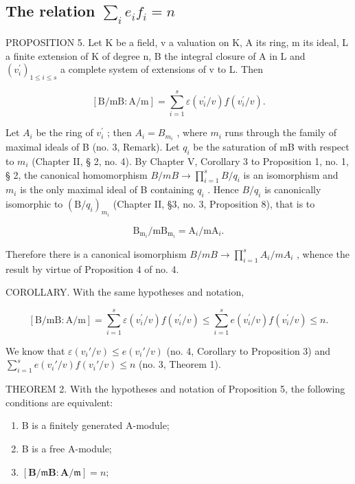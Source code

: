 \subsection{\texorpdfstring{The relation \(\sum_{i} e_{i} f_{i} = n\)}{The relation Σ ei fi = n}}

PROPOSITION 5. Let K be a field, v a valuation on K, A its ring, m its ideal, L a finite extension of K of degree n, B the integral closure of A in L and \((v_{i}^{\prime})_{1 \leq i \leq s}\) a complete system of extensions of v to L. Then

\[
[ \mathrm{B} / \mathrm{mB}: \mathrm{A} / \mathrm{m} ] = \sum_ {i = 1} ^ {s} \varepsilon (v _ {i} ^ {\prime} / v) f (v _ {i} ^ {\prime} / v).
\]

Let \(A_{i}\) be the ring of \(v_{i}^{\prime}\) ; then \(A_{i} = B_{m_{i}}\) , where \(m_{i}\) runs through the family of maximal ideals of B (no. 3, Remark). Let \(q_{i}\) be the saturation of mB with respect to \(m_{i}\) (Chapter II, § 2, no. 4). By Chapter V, Corollary 3 to Proposition 1, no. 1, § 2, the canonical homomorphism \(B/mB \rightarrow \prod_{i=1}^{s} B/q_i\) is an isomorphism and \(m_i\) is the only maximal ideal of B containing \(q_i\) . Hence \(B/q_i\) is canonically isomorphic to \((\mathrm{B}/q_i)_{m_i}\) (Chapter II, §3, no. 3, Proposition 8), that is to

\[
\mathrm{B} _ {\mathrm{m} _ {i}} / \mathrm{mB} _ {\mathrm{m} _ {i}} = \mathrm{A} _ {i} / \mathrm{mA} _ {i}.
\]

Therefore there is a canonical isomorphism \(B/mB \rightarrow \prod_{i=1}^{s} A_{i}/mA_{i}\) , whence the result by virtue of Proposition 4 of no. 4.

COROLLARY. With the same hypotheses and notation,

\[
[ \mathrm{B} / \mathrm{mB}: \mathrm{A} / \mathrm{m} ] = \sum_ {i = 1} ^ {s} \varepsilon (v _ {i} ^ {\prime} / v) f (v _ {i} ^ {\prime} / v) \leqslant \sum_ {i = 1} ^ {s} e (v _ {i} ^ {\prime} / v) f (v _ {i} ^ {\prime} / v) \leqslant n.
\]

We know that \(\varepsilon(v_i'/v) \leqslant e(v_i'/v)\) (no. 4, Corollary to Proposition 3) and \(\sum_{i=1}^{s} e(v_i'/v)f(v_i'/v) \leqslant n\) (no. 3, Theorem 1).

THEOREM 2. With the hypotheses and notation of Proposition 5, the following conditions are equivalent:

\begin{enumerate}
\def\labelenumi{(\alph{enumi})}
\item
  B is a finitely generated A-module;
\item
  B is a free A-module;
\item
  \([\mathbf{B} / \mathfrak{m}\mathbf{B}\colon \mathbf{A} / \mathfrak{m}] = n;\)
\end{enumerate}

